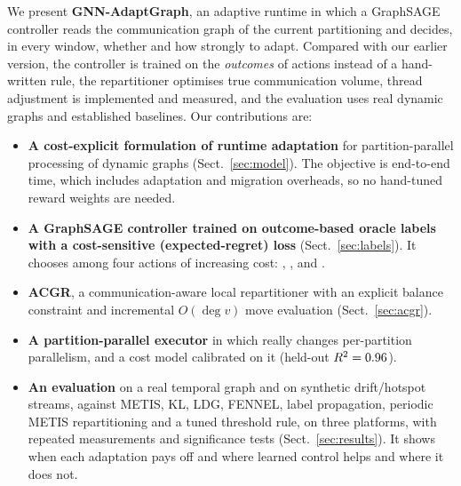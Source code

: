 We present \textbf{GNN-AdaptGraph}, an adaptive runtime in which a GraphSAGE controller
\cite{hamilton2017graphsage} reads the communication graph of the current partitioning and
decides, in every window, whether and how strongly to adapt. Compared with our earlier
version, the controller is trained on the \emph{outcomes} of actions instead of a hand-written
rule, the repartitioner optimises true communication volume, thread adjustment is
implemented and measured, and the evaluation uses real dynamic graphs and established
baselines. Our contributions are:
\begin{itemize}
  \item \textbf{A cost-explicit formulation of runtime adaptation} for partition-parallel
        processing of dynamic graphs (Sect.~\ref{sec:model}). The objective is end-to-end time,
        which includes adaptation and migration overheads, so no hand-tuned reward weights are needed.
  \item \textbf{A GraphSAGE controller trained on outcome-based oracle labels with a
        cost-sensitive (expected-regret) loss} (Sect.~\ref{sec:labels}). It chooses among four
        actions of increasing cost: \NOA{}, \TA{}, \RB{} and \RP{}.
  \item \textbf{ACGR}, a communication-aware local repartitioner with an explicit balance
        constraint and incremental $O(\deg v)$ move evaluation (Sect.~\ref{sec:acgr}).
  \item \textbf{A partition-parallel executor} in which \TA{} really changes per-partition
        parallelism, and a cost model calibrated on it (held-out $R^2=0.96$).
  \item \textbf{An evaluation} on a real temporal graph and on synthetic drift/hotspot
        streams, against METIS, KL, LDG, FENNEL, label propagation, periodic METIS
        repartitioning and a tuned threshold rule, on three platforms, with repeated
        measurements and significance tests (Sect.~\ref{sec:results}). It shows when each
        adaptation pays off and where learned control helps and where it does not.
\end{itemize}
